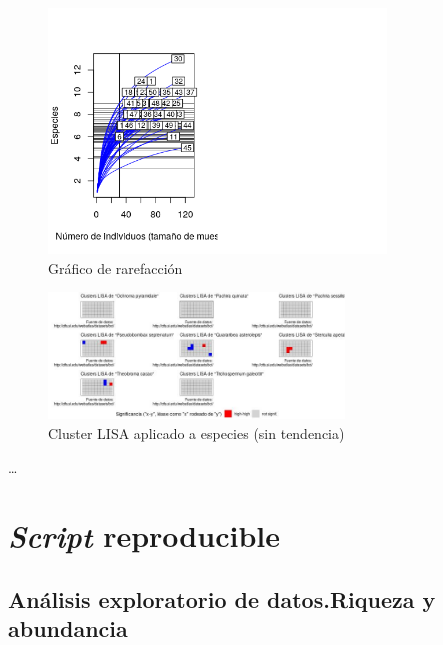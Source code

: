 \documentclass[11pt,]{article}
\begin{document}
\begin{figure}
\centering
\includegraphics[width=0.80000\textwidth]{grafico_de_rarefaccion.png}
\caption{Gráfico de rarefacción}
\end{figure}

\begin{figure}
\centering
\includegraphics[width=0.70000\textwidth]{cluster_LISA_aplicado_especies_transformadas_sin_tendencia.jpg}
\caption{Cluster LISA aplicado a especies (sin tendencia)}
\end{figure}

\ldots

\section{\texorpdfstring{\emph{Script}
reproducible}{Script reproducible}}\label{script-reproducible}

\subsection{Análisis exploratorio de datos.Riqueza y
abundancia}\label{anuxe1lisis-exploratorio-de-datos.riqueza-y-abundancia}
\end{document}
